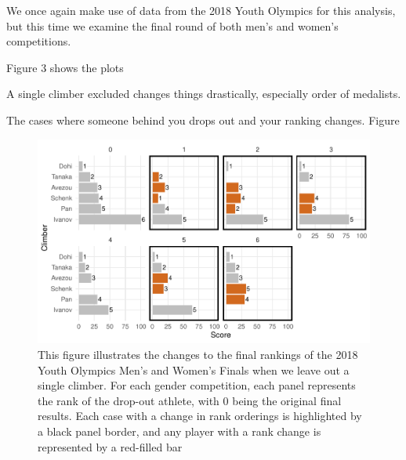 \documentclass[12pt]{article}
\begin{document}
We once again make use of data from the 2018 Youth Olympics for this
analysis, but this time we examine the final round of both men's and
women's competitions.

Figure 3 shows the plots

A single climber excluded changes things drastically, especially order
of medalists.

The cases where someone behind you drops out and your ranking changes.
Figure

\begin{figure}
\centering
\includegraphics{draft_files/figure-latex/unnamed-chunk-12-1.pdf}
\caption{This figure illustrates the changes to the final rankings of
the 2018 Youth Olympics Men's and Women's Finals when we leave out a
single climber. For each gender competition, each panel represents the
rank of the drop-out athlete, with 0 being the original final results.
Each case with a change in rank orderings is highlighted by a black
panel border, and any player with a rank change is represented by a
red-filled bar}
\end{figure}



\end{document}
